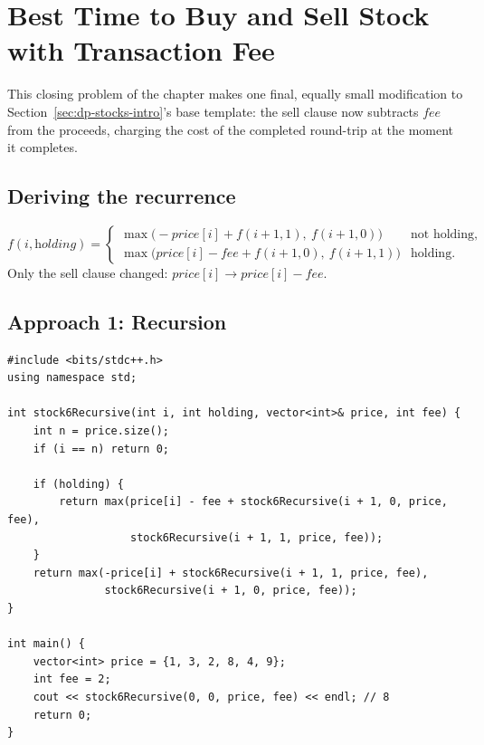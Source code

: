 \section{Best Time to Buy and Sell Stock with Transaction Fee}
\label{sec:dp-stock-6}


\begin{patternbox}
This closing problem of the chapter makes one final, equally small
modification to Section~\ref{sec:dp-stocks-intro}'s base template: the
sell clause now subtracts $\textit{fee}$ from the proceeds, charging the
cost of the completed round-trip at the moment it completes.
\end{patternbox}

\subsection*{Deriving the recurrence}

\[
  f(i, \textit{holding}) =
  \begin{cases}
    \max\big(-\textit{price}[i] + f(i{+}1, 1),\ f(i{+}1, 0)\big) &
    \text{not holding}, \\
    \max\big(\textit{price}[i] - \textit{fee} + f(i{+}1, 0),\
    f(i{+}1, 1)\big) & \text{holding.}
  \end{cases}
\]
Only the sell clause changed: $\textit{price}[i] \to \textit{price}[i]
- \textit{fee}$.

\subsection*{Approach 1: Recursion}

\begin{lstlisting}
#include <bits/stdc++.h>
using namespace std;

int stock6Recursive(int i, int holding, vector<int>& price, int fee) {
    int n = price.size();
    if (i == n) return 0;

    if (holding) {
        return max(price[i] - fee + stock6Recursive(i + 1, 0, price, fee),
                   stock6Recursive(i + 1, 1, price, fee));
    }
    return max(-price[i] + stock6Recursive(i + 1, 1, price, fee),
               stock6Recursive(i + 1, 0, price, fee));
}

int main() {
    vector<int> price = {1, 3, 2, 8, 4, 9};
    int fee = 2;
    cout << stock6Recursive(0, 0, price, fee) << endl; // 8
    return 0;
}
\end{lstlisting}

